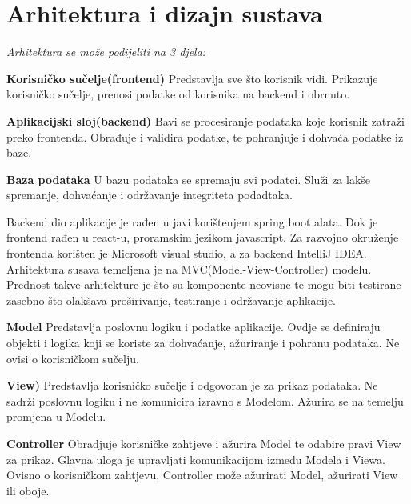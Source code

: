 \chapter{Arhitektura i dizajn sustava}

		\noindent\textit{Arhitektura se može podijeliti na 3 djela: }
		\begin{packed_item}
			\item \textbf{Korisničko sučelje(frontend)} Predstavlja sve što korisnik vidi. Prikazuje korisničko sučelje, prenosi podatke od korisnika na backend i obrnuto.
			\item \textbf{Aplikacijski sloj(backend)}
			Bavi se procesiranje podataka koje korisnik zatraži preko frontenda. Obrađuje i validira podatke, te pohranjuje i dohvaća podatke iz baze.
			\item \textbf{Baza podataka}
			U bazu podataka se spremaju svi podatci. Služi za lakše spremanje, dohvaćanje i održavanje integriteta podadtaka.
		\end{packed_item}
		
	
		
		\noindent Backend dio aplikacije je rađen u javi korištenjem spring boot alata. Dok je frontend rađen u react-u, proramskim jezikom javascript. Za razvojno okruženje frontenda korišten je Microsoft visual studio, a za backend IntelliJ IDEA. Arhitektura susava temeljena je na MVC(Model-View-Controller) modelu. Prednost takve arhitekture je što su komponente neovisne te mogu biti testirane zasebno što olakšava proširivanje, testiranje i održavanje aplikacije.
		
		\begin{packed_item}
	\item \textbf{Model} Predstavlja poslovnu logiku i podatke aplikacije. Ovdje se definiraju objekti i logika koji se koriste za dohvaćanje, ažuriranje i pohranu podataka. Ne ovisi o korisničkom sučelju.
	\item \textbf{View)}
	Predstavlja korisničko sučelje i odgovoran je za prikaz podataka. Ne sadrži poslovnu logiku i ne komunicira izravno s Modelom. Ažurira se na temelju promjena u Modelu.
	\item \textbf{Controller}
	Obradjuje korisničke zahtjeve i ažurira Model te odabire pravi View za prikaz. Glavna uloga je upravljati komunikacijom između Modela i Viewa. Ovisno o korisničkom zahtjevu, Controller može ažurirati Model, ažurirati View ili oboje.
\end{packed_item}
		

